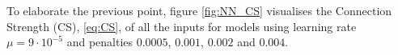 To elaborate the previous point, figure \autoref{fig:NN_CS} visualises the Connection Strength (CS), \autoref{eq:CS}, of all the inputs for models using learning rate $\mu = 9 \cdot 10^{-5}$ and penalties $0.0005$, $0.001$, $0.002$ and $0.004$. 

\begin{figure}[H]
\centering
{}
\qquad
{}
\qquad
{}

\end{figure}
